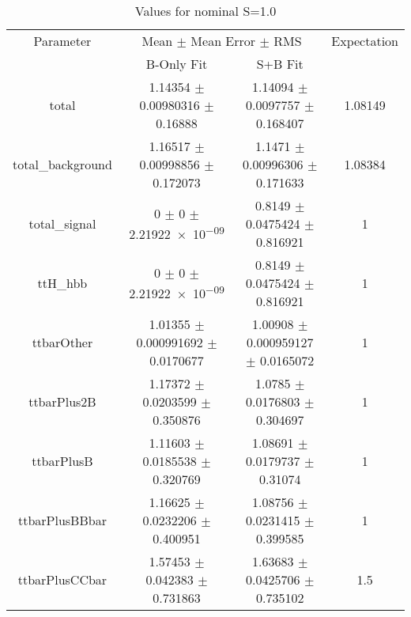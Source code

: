 \begin{table}
\centering
\caption{Values for nominal S=1.0}
\begin{tabular}{cccc}
\toprule
Parameter & \multicolumn{2}{c}{Mean $\pm$ Mean Error $\pm$ RMS} & Expectation\\
 & B-Only Fit & S+B Fit & \\
\midrule
total & \num{1.14354} $\pm$ \num{0.00980316} $\pm$ \num{0.16888} & \num{1.14094} $\pm$ \num{0.0097757} $\pm$ \num{0.168407} & \num{1.08149}\\
total\_background & \num{1.16517} $\pm$ \num{0.00998856} $\pm$ \num{0.172073} & \num{1.1471} $\pm$ \num{0.00996306} $\pm$ \num{0.171633} & \num{1.08384}\\
total\_signal & \num{0} $\pm$ \num{0} $\pm$ \num{2.21922e-09} & \num{0.8149} $\pm$ \num{0.0475424} $\pm$ \num{0.816921} & \num{1}\\
ttH\_hbb & \num{0} $\pm$ \num{0} $\pm$ \num{2.21922e-09} & \num{0.8149} $\pm$ \num{0.0475424} $\pm$ \num{0.816921} & \num{1}\\
ttbarOther & \num{1.01355} $\pm$ \num{0.000991692} $\pm$ \num{0.0170677} & \num{1.00908} $\pm$ \num{0.000959127} $\pm$ \num{0.0165072} & \num{1}\\
ttbarPlus2B & \num{1.17372} $\pm$ \num{0.0203599} $\pm$ \num{0.350876} & \num{1.0785} $\pm$ \num{0.0176803} $\pm$ \num{0.304697} & \num{1}\\
ttbarPlusB & \num{1.11603} $\pm$ \num{0.0185538} $\pm$ \num{0.320769} & \num{1.08691} $\pm$ \num{0.0179737} $\pm$ \num{0.31074} & \num{1}\\
ttbarPlusBBbar & \num{1.16625} $\pm$ \num{0.0232206} $\pm$ \num{0.400951} & \num{1.08756} $\pm$ \num{0.0231415} $\pm$ \num{0.399585} & \num{1}\\
ttbarPlusCCbar & \num{1.57453} $\pm$ \num{0.042383} $\pm$ \num{0.731863} & \num{1.63683} $\pm$ \num{0.0425706} $\pm$ \num{0.735102} & \num{1.5}\\
\bottomrule
\end{tabular}
\end{table}
